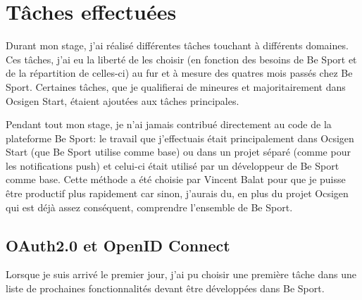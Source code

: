 \section{Tâches effectuées}

Durant mon stage, j'ai réalisé différentes tâches touchant à différents
domaines. Ces tâches, j'ai eu la liberté de les choisir (en fonction des besoins
de Be Sport et de la répartition de celles-ci) au fur et à mesure des quatres
mois passés chez Be Sport. Certaines tâches, que je qualifierai de mineures et
majoritairement dans Ocsigen Start, étaient ajoutées aux tâches principales.

Pendant tout mon stage, je n'ai jamais contribué directement au code de la
plateforme Be Sport: le travail que j'effectuais était principalement dans Ocsigen Start
(que Be Sport utilise comme base) ou dans un projet séparé (comme pour les
notifications push) et celui-ci était utilisé par un développeur de Be Sport comme
base. Cette méthode a été choisie par Vincent Balat pour que je puisse être
productif plus rapidement car sinon, j'aurais du, en plus du projet Ocsigen qui
est déjà assez conséquent, comprendre l'ensemble de Be Sport.

\subsection{OAuth2.0 et OpenID Connect}

Lorsque je suis arrivé le premier jour, j'ai pu choisir une première tâche dans
une liste de prochaines fonctionnalités devant être développées dans Be Sport.

